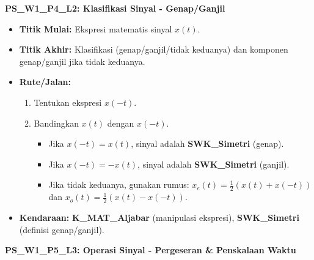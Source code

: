 \documentclass[
  letterpaper,
  DIV=11,
  numbers=noendperiod]{scrreprt}
\providecommand{\tightlist}{%
  \setlength{\itemsep}{0pt}\setlength{\parskip}{0pt}}\usepackage{longtable,booktabs,array}
\begin{document}
\textbf{PS\_W1\_P4\_L2: Klasifikasi Sinyal - Genap/Ganjil}

\begin{itemize}
\tightlist
\item
  \textbf{Titik Mulai:} Ekspresi matematis sinyal \(x(t)\).
\item
  \textbf{Titik Akhir:} Klasifikasi (genap/ganjil/tidak keduanya) dan
  komponen genap/ganjil jika tidak keduanya.
\item
  \textbf{Rute/Jalan:}

  \begin{enumerate}
  \def\labelenumi{\arabic{enumi}.}
  \tightlist
  \item
    Tentukan ekspresi \(x(-t)\).
  \item
    Bandingkan \(x(t)\) dengan \(x(-t)\).

    \begin{itemize}
    \tightlist
    \item
      Jika \(x(-t) = x(t)\), sinyal adalah \textbf{SWK\_Simetri}
      (genap).
    \item
      Jika \(x(-t) = -x(t)\), sinyal adalah \textbf{SWK\_Simetri}
      (ganjil).
    \item
      Jika tidak keduanya, gunakan rumus:
      \(x_e(t) = \frac{1}{2}(x(t) + x(-t))\) dan
      \(x_o(t) = \frac{1}{2}(x(t) - x(-t))\).
    \end{itemize}
  \end{enumerate}
\item
  \textbf{Kendaraan:} \textbf{K\_MAT\_Aljabar} (manipulasi ekspresi),
  \textbf{SWK\_Simetri} (definisi genap/ganjil).
\end{itemize}

\textbf{PS\_W1\_P5\_L3: Operasi Sinyal - Pergeseran \& Penskalaan Waktu}
\end{document}
